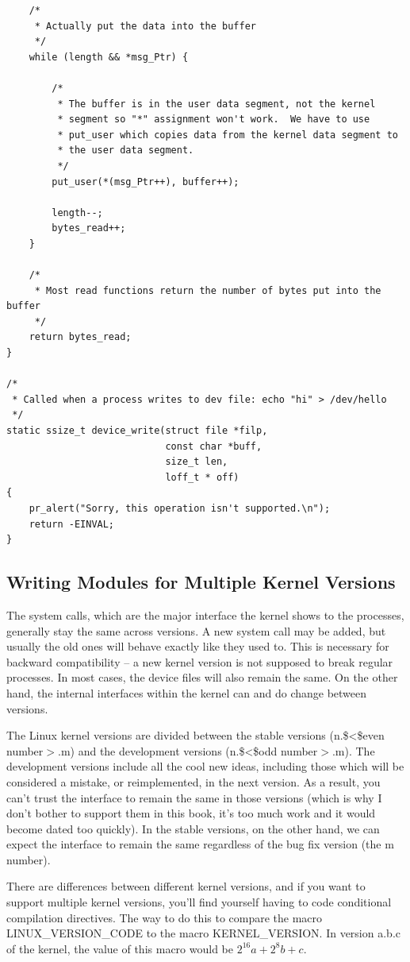 \documentclass[11pt]{article}
\begin{document}
\begin{verbatim}
    /*
     * Actually put the data into the buffer
     */
    while (length && *msg_Ptr) {

        /*
         * The buffer is in the user data segment, not the kernel
         * segment so "*" assignment won't work.  We have to use
         * put_user which copies data from the kernel data segment to
         * the user data segment.
         */
        put_user(*(msg_Ptr++), buffer++);

        length--;
        bytes_read++;
    }

    /*
     * Most read functions return the number of bytes put into the buffer
     */
    return bytes_read;
}

/*
 * Called when a process writes to dev file: echo "hi" > /dev/hello
 */
static ssize_t device_write(struct file *filp,
                            const char *buff,
                            size_t len,
                            loff_t * off)
{
    pr_alert("Sorry, this operation isn't supported.\n");
    return -EINVAL;
}
\end{verbatim}

\subsection*{Writing Modules for Multiple Kernel Versions}
\label{sec:org7c5b605}
The system calls, which are the major interface the kernel shows to the processes, generally stay the same across versions. A new system call may be added, but usually the old ones will behave exactly like they used to. This is necessary for backward compatibility -- a new kernel version is not supposed to break regular processes. In most cases, the device files will also remain the same. On the other hand, the internal interfaces within the kernel can and do change between versions.

The Linux kernel versions are divided between the stable versions (n.\$<\$even number\(>\).m) and the development versions (n.\$<\$odd number\(>\).m). The development versions include all the cool new ideas, including those which will be considered a mistake, or reimplemented, in the next version. As a result, you can't trust the interface to remain the same in those versions (which is why I don't bother to support them in this book, it's too much work and it would become dated too quickly). In the stable versions, on the other hand, we can expect the interface to remain the same regardless of the bug fix version (the m number).

There are differences between different kernel versions, and if you want to support multiple kernel versions, you'll find yourself having to code conditional compilation directives. The way to do this to compare the macro LINUX\_VERSION\_CODE to the macro KERNEL\_VERSION. In version a.b.c of the kernel, the value of this macro would be \(2^{16}a+2^{8}b+c\).
\end{document}

